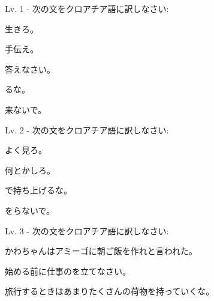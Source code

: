 
\author{Kristijan Čavić}

	
	\begin{mondai}{Lv. 1 - 次の文をクロアチア語に訳しなさい: }
		\item 生きろ。
		\item 手伝え。
		\item 答えなさい。
		\item {}るな。
		\item 来ないで。
	\end{mondai}
	
	\begin{mondai}{Lv. 2 - 次の文をクロアチア語に訳しなさい:}
		\item よく見ろ。
		\item 何とかしろ。
		\item {}で持ち上げるな。
		\item {}をらないで。
	\end{mondai}
	
	\begin{mondai}{Lv. 3 - 次の文をクロアチア語に訳しなさい:}
		\item かわちゃんはアミーゴに朝ご飯を作れと言われた。
		\item 始める前に仕事のを立てなさい。
		\item 旅行するときはあまりたくさんの荷物を持っていくな。
	\end{mondai}
